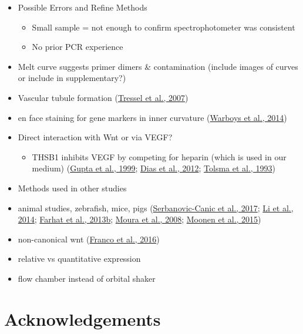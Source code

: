 \documentclass[
  11pt,
]{article}
\providecommand{\tightlist}{%
  \setlength{\itemsep}{0pt}\setlength{\parskip}{0pt}}
\begin{document}
\color{red}

\begin{itemize}
\item
  Possible Errors and Refine Methods

  \begin{itemize}
  \item
    Small sample = not enough to confirm spectrophotometer was consistent
  \item
    No prior PCR experience
  \end{itemize}
\item
  Melt curve suggests primer dimers \& contamination (include images of curves or include in supplementary?)
\item
  Vascular tubule formation (\protect\hyperlink{ref-Tressel2007}{Tressel et al., 2007})
\item
  en face staining for gene markers in inner curvature (\protect\hyperlink{ref-Warboys2014}{Warboys et al., 2014})
\item
  Direct interaction with Wnt or via VEGF?

  \begin{itemize}
  \tightlist
  \item
    THSB1 inhibits VEGF by competing for heparin (which is used in our medium) (\protect\hyperlink{ref-gupta1999}{Gupta et al., 1999}; \protect\hyperlink{ref-dias2012}{Dias et al., 2012}; \protect\hyperlink{ref-tolsma1993}{Tolsma et al., 1993})
  \end{itemize}
\item
  Methods used in other studies
\item
  animal studies, zebrafish, mice, pigs (\protect\hyperlink{ref-serbanovic-canic2017}{Serbanovic-Canic et al., 2017}; \protect\hyperlink{ref-Li2014-mx}{Li et al., 2014}; \protect\hyperlink{ref-farhat2013a}{Farhat et al., 2013b}; \protect\hyperlink{ref-Moura2008}{Moura et al., 2008}; \protect\hyperlink{ref-moonen2015}{Moonen et al., 2015})
\item
  non-canonical wnt (\protect\hyperlink{ref-franco2016}{Franco et al., 2016})
\item
  relative vs quantitative expression
\item
  flow chamber instead of orbital shaker
\end{itemize}

\color{black}

\hypertarget{acknowledgements}{%
\section{Acknowledgements}\label{acknowledgements}}
\end{document}
